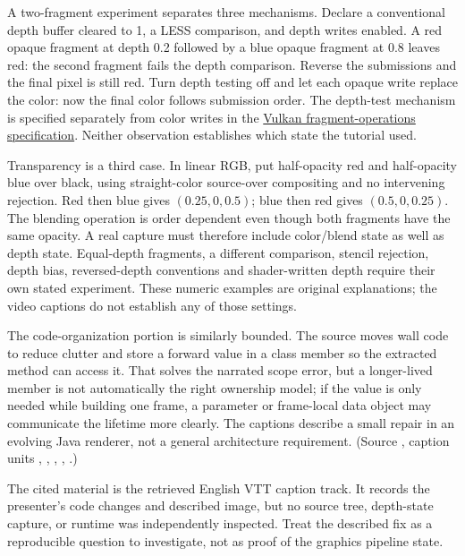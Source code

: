A two-fragment experiment separates three mechanisms. Declare a conventional depth buffer cleared to 1, a LESS comparison, and depth writes enabled. A red opaque fragment at depth 0.2 followed by a blue opaque fragment at 0.8 leaves red: the second fragment fails the depth comparison. Reverse the submissions and the final pixel is still red. Turn depth testing off and let each opaque write replace the color: now the final color follows submission order. The depth-test mechanism is specified separately from color writes in the \href{https://docs.vulkan.org/spec/latest/chapters/fragops.html\#fragops-depth}{Vulkan fragment-operations specification}. Neither observation establishes which state the tutorial used.

Transparency is a third case. In linear RGB, put half-opacity red and half-opacity blue over black, using straight-color source-over compositing and no intervening rejection. Red then blue gives \((0.25,0,0.5)\); blue then red gives \((0.5,0,0.25)\). The blending operation is order dependent even though both fragments have the same opacity. A real capture must therefore include color/blend state as well as depth state. Equal-depth fragments, a different comparison, stencil rejection, depth bias, reversed-depth conventions and shader-written depth require their own stated experiment. These numeric examples are original explanations; the video captions do not establish any of those settings.

The code-organization portion is similarly bounded. The source moves wall code to reduce clutter and store a forward value in a class member so the extracted method can access it. That solves the narrated scope error, but a longer-lived member is not automatically the right ownership model; if the value is only needed while building one frame, a parameter or frame-local data object may communicate the lifetime more clearly. The captions describe a small repair in an evolving Java renderer, not a general architecture requirement. (Source , caption units , , , , .)

The cited material is the retrieved English VTT caption track. It records the presenter's code changes and described image, but no source tree, depth-state capture, or runtime was independently inspected. Treat the described fix as a reproducible question to investigate, not as proof of the graphics pipeline state.

